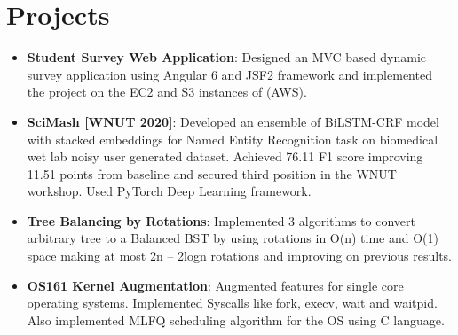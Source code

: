 \documentclass[letterpaper,11pt]{article}
\newcommand{\resumeItem}[2]{
  \item\small{
    \textbf{#1}{: #2 \vspace{-2pt}}
  }
}
\newcommand{\resumeSubItem}[2]{\resumeItem{#1}{#2}\vspace{-4pt}}
\newcommand{\resumeSubHeadingListStart}{\begin{itemize}[leftmargin=*]}
\newcommand{\resumeSubHeadingListEnd}{\end{itemize}}
\begin{document}
\section{Projects}
  \resumeSubHeadingListStart
    \resumeSubItem{Student Survey Web Application}
      { Designed an MVC based dynamic survey application using Angular 6 and JSF2 framework and implemented the project on the EC2 and S3 instances of (AWS).}
    \resumeSubItem{SciMash [WNUT 2020]}
      {Developed an ensemble of BiLSTM-CRF model with stacked embeddings for Named Entity Recognition task on biomedical wet lab noisy user generated dataset. Achieved 76.11 F1 score improving 11.51 points from baseline and secured third position in the WNUT workshop. Used PyTorch Deep Learning framework.}
     \resumeSubItem{Tree Balancing by Rotations}
      {Implemented 3 algorithms to convert arbitrary tree to a Balanced BST by using rotations in O(n) time and O(1) space making at most 2n – 2logn rotations and improving on previous results.}
    \resumeSubItem{OS161 Kernel Augmentation}
      {Augmented features for single core operating systems. Implemented Syscalls like fork, execv, wait and waitpid. Also implemented MLFQ scheduling algorithm for the OS using C language.}
  \resumeSubHeadingListEnd

%



\end{document}
